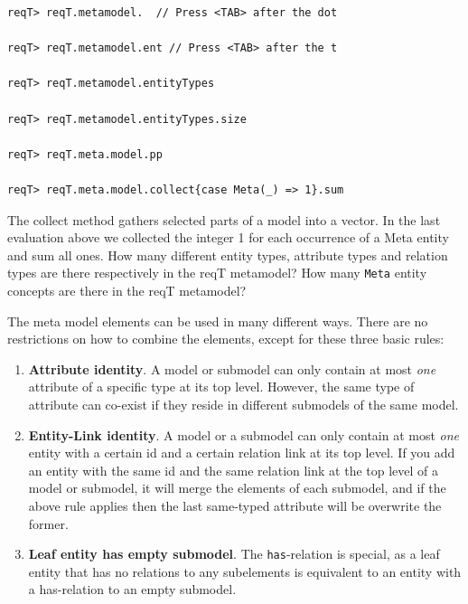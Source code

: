 \documentclass[11pt]{article}
\begin{document}
\begin{framed}
{\footnotesize\begin{verbatim}
reqT> reqT.metamodel.  // Press <TAB> after the dot

reqT> reqT.metamodel.ent // Press <TAB> after the t

reqT> reqT.metamodel.entityTypes

reqT> reqT.metamodel.entityTypes.size

reqT> reqT.meta.model.pp

reqT> reqT.meta.model.collect{case Meta(_) => 1}.sum
\end{verbatim}}
\noindent The collect method gathers selected parts of a model into a vector. In the last evaluation above we collected the integer 1 for each occurrence of a Meta entity and sum all ones.
\newline\newline 
\noindent
How many different entity types, attribute types and relation types are there respectively in the reqT metamodel? 
\newline
\newline \underline{\hspace{10cm}}
\newline\newline
How many \verb+Meta+ entity concepts are there in the reqT metamodel? 
\newline
\newline \underline{\hspace{10cm}}
\end{framed}

The meta model elements can be used in many different ways. There are no restrictions on how to combine the elements, except for these three basic rules:
\begin{enumerate}
\item {\bf Attribute identity}. A model or submodel can only contain at most {\it one} attribute of a specific type at its top level. However, the same type of attribute can co-exist if they reside in different submodels of the same model. 
\item {\bf Entity-Link identity}. A model or a submodel can only contain at most {\it one} entity with a certain id and a certain relation link at its top level. If you add an entity with the same id and the same relation link at the top level of a model or submodel, it will merge the elements of each submodel, and if the above rule applies then the last same-typed attribute will be overwrite the former. 
\item {\bf Leaf entity has empty submodel}. The \verb+has+-relation is special, as a leaf entity that has no relations to any subelements is equivalent to an entity with a has-relation to an empty submodel. 
\end{enumerate}
\end{document}
